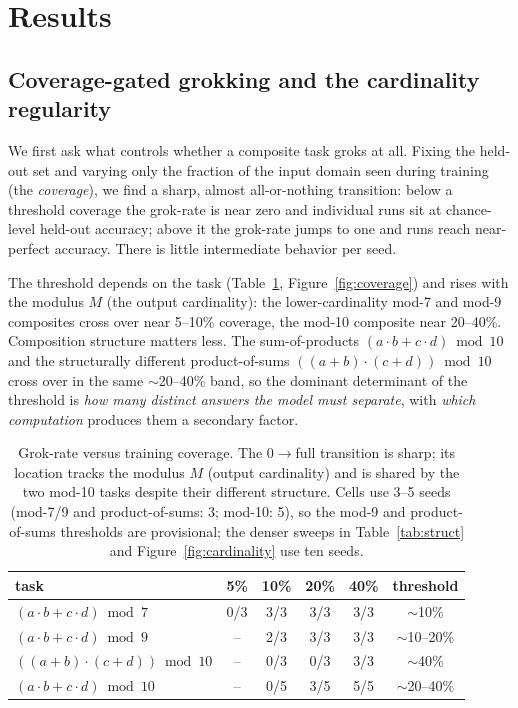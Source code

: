 \documentclass[10pt]{article} %
\begin{document}
\section{Results}
\label{sec:results}

\subsection{Coverage-gated grokking and the cardinality regularity}
\label{sec:coverage}

We first ask what controls whether a composite task groks at all. Fixing the held-out set and
varying only the fraction of the input domain seen during training (the \emph{coverage}), we find
a sharp, almost all-or-nothing transition: below a threshold coverage the grok-rate is near zero
and individual runs sit at chance-level held-out accuracy; above it the grok-rate jumps to one and
runs reach near-perfect accuracy. There is little intermediate behavior per seed.

The threshold depends on the task (Table~\ref{tab:coverage}, Figure~\ref{fig:coverage}) and rises
with the modulus $M$ (the output cardinality): the lower-cardinality mod-7 and mod-9 composites
cross over near 5--10\% coverage, the mod-10 composite near 20--40\%. Composition structure matters
less. The sum-of-products $(a\cdot b + c\cdot d)\bmod 10$ and the structurally different
product-of-sums $((a{+}b)\cdot(c{+}d))\bmod 10$ cross over in the same $\sim$20--40\% band, so the
dominant determinant of the threshold is \emph{how many distinct answers the model must separate},
with \emph{which computation} produces them a secondary factor.

\begin{table}[t]
\caption{Grok-rate versus training coverage. The 0$\rightarrow$full transition is sharp; its
location tracks the modulus $M$ (output cardinality) and is shared by the two mod-10 tasks despite
their different structure. Cells use 3--5 seeds (mod-7/9 and product-of-sums: 3; mod-10: 5), so the
mod-9 and product-of-sums thresholds are provisional; the denser sweeps in Table~\ref{tab:struct}
and Figure~\ref{fig:cardinality} use ten seeds.}
\label{tab:coverage}
\begin{center}
\begin{tabular}{lccccc}
\toprule
task & 5\% & 10\% & 20\% & 40\% & threshold \\
\midrule
$(a\cdot b + c\cdot d)\bmod 7$  & 0/3 & 3/3 & 3/3 & 3/3 & $\sim$10\% \\
$(a\cdot b + c\cdot d)\bmod 9$  & --  & 2/3 & 3/3 & 3/3 & $\sim$10--20\% \\
$((a{+}b)\cdot(c{+}d))\bmod 10$ & --  & 0/3 & 0/3 & 3/3 & $\sim$40\% \\
$(a\cdot b + c\cdot d)\bmod 10$ & --  & 0/5 & 3/5 & 5/5 & $\sim$20--40\% \\
\bottomrule
\end{tabular}
\end{center}
\end{table}
\end{document}
